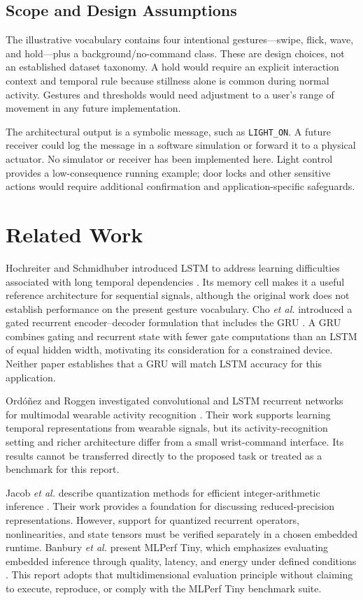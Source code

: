 \documentclass[conference]{IEEEtran}
\begin{document}
\subsection{Scope and Design Assumptions}
The illustrative vocabulary contains four intentional gestures---swipe, flick, wave, and hold---plus a background/no-command class. These are design choices, not an established dataset taxonomy. A hold would require an explicit interaction context and temporal rule because stillness alone is common during normal activity. Gestures and thresholds would need adjustment to a user's range of movement in any future implementation.

The architectural output is a symbolic message, such as \texttt{LIGHT\_ON}. A future receiver could log the message in a software simulation or forward it to a physical actuator. No simulator or receiver has been implemented here. Light control provides a low-consequence running example; door locks and other sensitive actions would require additional confirmation and application-specific safeguards.

\section{Related Work}
Hochreiter and Schmidhuber introduced LSTM to address learning difficulties associated with long temporal dependencies \cite{hochreiter1997}. Its memory cell makes it a useful reference architecture for sequential signals, although the original work does not establish performance on the present gesture vocabulary. Cho \emph{et al.} introduced a gated recurrent encoder--decoder formulation that includes the GRU \cite{cho2014}. A GRU combines gating and recurrent state with fewer gate computations than an LSTM of equal hidden width, motivating its consideration for a constrained device. Neither paper establishes that a GRU will match LSTM accuracy for this application.

Ord\'{o}\~{n}ez and Roggen investigated convolutional and LSTM recurrent networks for multimodal wearable activity recognition \cite{ordonez2016}. Their work supports learning temporal representations from wearable signals, but its activity-recognition setting and richer architecture differ from a small wrist-command interface. Its results cannot be transferred directly to the proposed task or treated as a benchmark for this report.

Jacob \emph{et al.} describe quantization methods for efficient integer-arithmetic inference \cite{jacob2018}. Their work provides a foundation for discussing reduced-precision representations. However, support for quantized recurrent operators, nonlinearities, and state tensors must be verified separately in a chosen embedded runtime. Banbury \emph{et al.} present MLPerf Tiny, which emphasizes evaluating embedded inference through quality, latency, and energy under defined conditions \cite{banbury2021}. This report adopts that multidimensional evaluation principle without claiming to execute, reproduce, or comply with the MLPerf Tiny benchmark suite.
\end{document}

